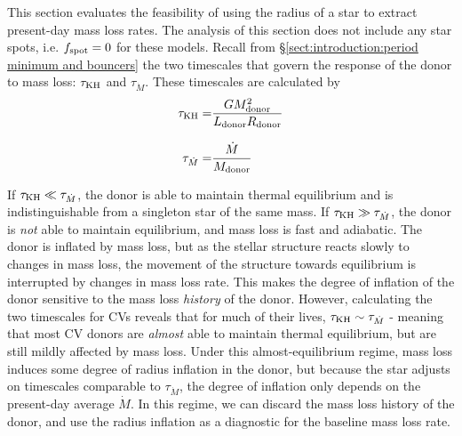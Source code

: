 This section evaluates the feasibility of using the radius of a star to extract present-day mass loss rates.
The analysis of this section does not include any star spots, i.e. $f_{\rm spot} = 0$ for these models.
Recall from \S\ref{sect:introduction:period minimum and bouncers} the two timescales that govern the response of the donor to mass loss: $\tau_{\rm KH}$ and $\tau_{\dot M}$. These timescales are calculated by
\begin{align}
    \tau_{\rm KH} =& \frac{G M_{\rm donor}^2}{L_{\rm donor} R_{\rm donor}} \\[8pt]
    \tau_{\dot M} =& \frac{\dot M}{M_{\rm donor}}
\end{align}

If $\tau_{\rm KH} \ll \tau_{\dot M}$, the donor is able to maintain thermal equilibrium and is indistinguishable from a singleton star of the same mass.
If $\tau_{\rm KH} \gg \tau_{\dot M}$, the donor is \textit{not} able to maintain equilibrium, and mass loss is fast and adiabatic.
The donor is inflated by mass loss, but as the stellar structure reacts slowly to changes in mass loss, the movement of the structure towards equilibrium is interrupted by changes in mass loss rate. This makes the degree of inflation of the donor sensitive to the mass loss \textit{history} of the donor.
However, calculating the two timescales for CVs reveals that for much of their lives, $\tau_{\rm KH} \sim \tau_{\dot M}$ \citep{knigge11} - meaning that most CV donors are \textit{almost} able to maintain thermal equilibrium, but are still mildly affected by mass loss.
Under this almost-equilibrium regime, mass loss induces some degree of radius inflation in the donor, but because the star adjusts on timescales comparable to $\tau_{\dot M}$, the degree of inflation only depends on the present-day average $\dot M$. In this regime, we can discard the mass loss history of the donor, and use the radius inflation as a diagnostic for the baseline mass loss rate.


